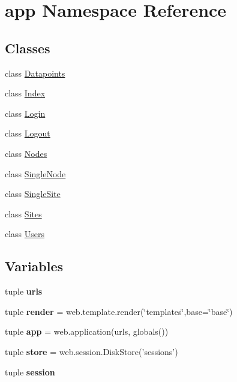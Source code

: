 \hypertarget{namespaceapp}{\section{app Namespace Reference}
\label{namespaceapp}
}
\subsection*{Classes}
\begin{DoxyCompactItemize}
\item 
class \hyperlink{classapp_1_1_datapoints}{Datapoints}
\item 
class \hyperlink{classapp_1_1_index}{Index}
\item 
class \hyperlink{classapp_1_1_login}{Login}
\item 
class \hyperlink{classapp_1_1_logout}{Logout}
\item 
class \hyperlink{classapp_1_1_nodes}{Nodes}
\item 
class \hyperlink{classapp_1_1_single_node}{Single\+Node}
\item 
class \hyperlink{classapp_1_1_single_site}{Single\+Site}
\item 
class \hyperlink{classapp_1_1_sites}{Sites}
\item 
class \hyperlink{classapp_1_1_users}{Users}
\end{DoxyCompactItemize}
\subsection*{Variables}
\begin{DoxyCompactItemize}
\item 
\hypertarget{namespaceapp_af502a6cc4eef7de60de488c3509f8300}{tuple {\bfseries urls}}\label{namespaceapp_af502a6cc4eef7de60de488c3509f8300}

\item 
\hypertarget{namespaceapp_a5296b2abdb32e25fbcb05aa72cc9f45f}{tuple {\bfseries render} = web.\+template.\+render(\char`\"{}templates\char`\"{},base=\char`\"{}base\char`\"{})}\label{namespaceapp_a5296b2abdb32e25fbcb05aa72cc9f45f}

\item 
\hypertarget{namespaceapp_ad3afa162eb284cf3d0ed835917982bc9}{tuple {\bfseries app} = web.\+application(urls, globals())}\label{namespaceapp_ad3afa162eb284cf3d0ed835917982bc9}

\item 
\hypertarget{namespaceapp_a04420db5351f8035f19ebd43f9c887c7}{tuple {\bfseries store} = web.\+session.\+Disk\+Store('sessions')}\label{namespaceapp_a04420db5351f8035f19ebd43f9c887c7}

\item 
tuple {\bfseries session}
\end{DoxyCompactItemize}


